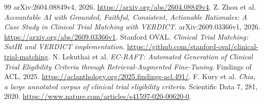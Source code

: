 \documentclass[10pt,letterpaper]{article}
\begin{document}
\begin{thebibliography}{99}
arXiv:2604.08849v4, 2026. \url{https://arxiv.org/abs/2604.08849v4}.
 Z. Zhou et al. \emph{Accountable AI with Grounded, Faithful, Consistent, Actionable Rationales: A Case Study in Clinical Trial Matching with VERDICT}.
arXiv:2609.03366v1, 2026. \url{https://arxiv.org/abs/2609.03366v1}.
 Stanford OVAL. \emph{Clinical Trial Matching: SatIR and VERDICT implementation}.
\url{https://github.com/stanford-oval/clinical-trial-matching}.
 N. Lekuthai et al. \emph{EC-RAFT: Automated Generation of Clinical Trial Eligibility Criteria through Retrieval-Augmented Fine-Tuning}.
Findings of ACL, 2025. \url{https://aclanthology.org/2025.findings-acl.491/}.
 F. Kury et al. \emph{Chia, a large annotated corpus of clinical trial eligibility criteria}.
Scientific Data 7, 281, 2020. \url{https://www.nature.com/articles/s41597-020-00620-0}.
\end{thebibliography}
\end{document}
